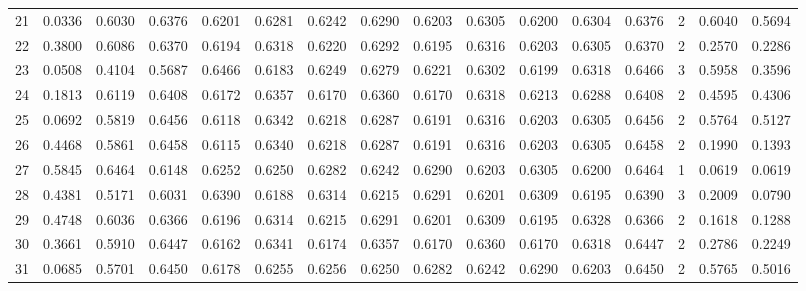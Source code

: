 \begin{tabular}{lrrrrrrrrrrrrrrr}
21  &      0.0336 &  0.6030 &  0.6376 &  0.6201 &  0.6281 &  0.6242 &  0.6290 &  0.6203 &  0.6305 &  0.6200 &   0.6304 &     0.6376 &      2 &                    0.6040 &                     0.5694 \\
22  &      0.3800 &  0.6086 &  0.6370 &  0.6194 &  0.6318 &  0.6220 &  0.6292 &  0.6195 &  0.6316 &  0.6203 &   0.6305 &     0.6370 &      2 &                    0.2570 &                     0.2286 \\
23  &      0.0508 &  0.4104 &  0.5687 &  0.6466 &  0.6183 &  0.6249 &  0.6279 &  0.6221 &  0.6302 &  0.6199 &   0.6318 &     0.6466 &      3 &                    0.5958 &                     0.3596 \\
24  &      0.1813 &  0.6119 &  0.6408 &  0.6172 &  0.6357 &  0.6170 &  0.6360 &  0.6170 &  0.6318 &  0.6213 &   0.6288 &     0.6408 &      2 &                    0.4595 &                     0.4306 \\
25  &      0.0692 &  0.5819 &  0.6456 &  0.6118 &  0.6342 &  0.6218 &  0.6287 &  0.6191 &  0.6316 &  0.6203 &   0.6305 &     0.6456 &      2 &                    0.5764 &                     0.5127 \\
26  &      0.4468 &  0.5861 &  0.6458 &  0.6115 &  0.6340 &  0.6218 &  0.6287 &  0.6191 &  0.6316 &  0.6203 &   0.6305 &     0.6458 &      2 &                    0.1990 &                     0.1393 \\
27  &      0.5845 &  0.6464 &  0.6148 &  0.6252 &  0.6250 &  0.6282 &  0.6242 &  0.6290 &  0.6203 &  0.6305 &   0.6200 &     0.6464 &      1 &                    0.0619 &                     0.0619 \\
28  &      0.4381 &  0.5171 &  0.6031 &  0.6390 &  0.6188 &  0.6314 &  0.6215 &  0.6291 &  0.6201 &  0.6309 &   0.6195 &     0.6390 &      3 &                    0.2009 &                     0.0790 \\
29  &      0.4748 &  0.6036 &  0.6366 &  0.6196 &  0.6314 &  0.6215 &  0.6291 &  0.6201 &  0.6309 &  0.6195 &   0.6328 &     0.6366 &      2 &                    0.1618 &                     0.1288 \\
30  &      0.3661 &  0.5910 &  0.6447 &  0.6162 &  0.6341 &  0.6174 &  0.6357 &  0.6170 &  0.6360 &  0.6170 &   0.6318 &     0.6447 &      2 &                    0.2786 &                     0.2249 \\
31  &      0.0685 &  0.5701 &  0.6450 &  0.6178 &  0.6255 &  0.6256 &  0.6250 &  0.6282 &  0.6242 &  0.6290 &   0.6203 &     0.6450 &      2 &                    0.5765 &                     0.5016 \\

\end{tabular}
